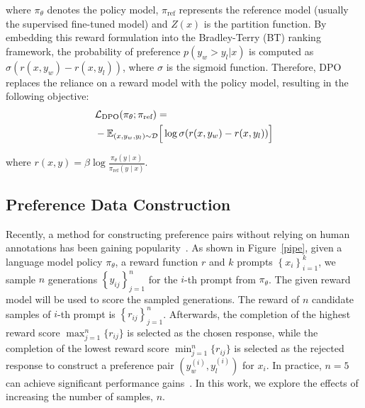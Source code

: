 where $\pi_\theta$ denotes the policy model, $\pi_{\text{ref}}$ represents the reference model (usually the supervised fine-tuned model) and $Z(x)$ is the partition function. 
By embedding this reward formulation into the Bradley-Terry (BT) ranking framework, the probability of preference $p(y_w > y_l | x)$ is computed as $\sigma(r(x, y_w) - r(x, y_l))$, where $\sigma$ is the sigmoid function. Therefore, DPO replaces the reliance on a reward model with the policy model, resulting in the following objective:
\begin{align}
& \mathcal{L}_{\text{DPO}}(\pi_\theta; \pi_{\text{ref}}) = \notag \\
& -\mathbb{E}_{(x, y_w, y_l) \sim \mathcal{D}} \Big[ \log \sigma(r(x, y_w) - r(x, y_l)) \Big] \notag
\end{align}

where $r(x, y) = \beta \log \frac{\pi_\theta(y \mid x)}{\pi_{\text{ref}}(y \mid x)}$.


\subsection{Preference Data Construction}
\label{conven_pipe}
Recently, a method for constructing preference pairs without relying on human annotations has been gaining popularity~\cite{dong2023raft, meng2024simpo}.
As shown in Figure~\ref{pipe}, given a language model policy $\pi_{\theta}$,  a reward function $r$ and $k$ prompts $\left\{x_i\right\}_{i=1}^k$, we sample $n$ generations $\left\{y_{ij}\right\}_{j=1}^n$ for the $i$-th prompt from $\pi_{\theta}$. 
The given reward model will be used to score the sampled generations.
The reward of $n$ candidate samples of $i$-th prompt is $\left\{r_{ij}\right\}_{j=1}^n$.
Afterwards, the completion of the highest reward score $\max_{j=1}^{n} \{r_{ij}\}$
is selected as the chosen response, while the completion of the lowest reward score $\min_{j=1}^{n} \{r_{ij}\}$ is selected as the rejected response to construct a preference pair $(y_w^{(i)}, y_l^{(i)})$ for $x_i$. 
In practice, $n=5$ can achieve significant performance gains~\cite{meng2024simpo}.
In this work, we explore the effects of increasing the number of samples, $n$.